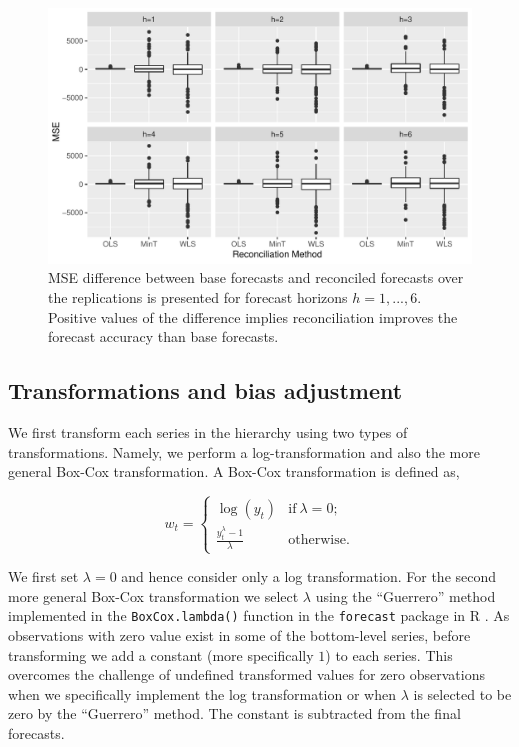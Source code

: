 \documentclass[12pt]{article}
\theoremstyle{definition}
\theoremstyle{property}
\begin{document}
    \begin{figure}[H]
    	\centering
    	\small
    	\includegraphics[width = \textwidth]{Figs/OrthVsOblq_Proj_Emp_results.pdf}
    	\caption{MSE difference between base forecasts and reconciled forecasts over the replications is presented for forecast horizons $h = 1,...,6$. Positive values of the difference implies reconciliation improves the forecast accuracy than base forecasts.}\label{fig:BaseVSRecon_Fc}
    \end{figure}
         

	\subsection{Transformations and bias adjustment}
	
	We first transform each series in the hierarchy using two types of transformations. Namely, we perform a log-transformation and also the more general Box-Cox transformation. A Box-Cox transformation is defined as,
		
\begin{equation} \label{eq:BoxCox_transformation}
	w_t =
	\begin{cases}
	\log(y_t) & \text{if}~\lambda=0;\\
	\frac{y_t^\lambda - 1}{\lambda}  & \text{otherwise}.
	\end{cases}
\end{equation}

We first set $\lambda=0$ and hence consider only a log transformation. For the second more general Box-Cox transformation we select $\lambda$ using the ``Guerrero'' method \citep{guerrero1993time} implemented in the \verb|BoxCox.lambda()| function in the \verb|forecast| package in R \citep{Rforecast}. As observations with zero value exist in some of the bottom-level series, before transforming we add a constant (more specifically $1$) to each series. This overcomes the challenge of undefined transformed values for zero observations when we specifically implement the log transformation or when $\lambda$ is selected to be zero by the ``Guerrero'' method. The constant is subtracted from the final forecasts.
\end{document}
